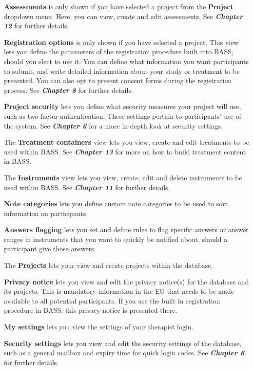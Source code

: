 \documentclass[
]{book}
\begin{document}
\textbf{Assessments} is only shown if you have selected a project from the \textbf{Project} dropdown menu. Here, you can view, create and edit assessments. See \textbf{\emph{Chapter 12}} for further details.

\textbf{Registration options} is only shown if you have selected a project. This view lets you define the parameters of the registration procedure built into BASS, should you elect to use it. You can define what information you want participants to submit, and write detailed information about your study or treatment to be presented. You can also opt to present consent forms during the registration process. See \textbf{\emph{Chapter 8}} for further details.

\textbf{Project security} lets you define what security measures your project will use, such as two-factor authentication. These settings pertain to participants' use of the system. See \textbf{\emph{Chapter 6}} for a more in-depth look at security settings.

The \textbf{Treatment containers} view lets you view, create and edit treatments to be used within BASS. See \textbf{\emph{Chapter 13}} for more on how to build treatment content in BASS.

The \textbf{Instruments} view lets you view, create, edit and delete instruments to be used within BASS. See \textbf{\emph{Chapter 11}} for further details.

\textbf{Note categories} lets you define custom note categories to be used to sort information on participants.

\textbf{Answers flagging} lets you set and define rules to flag specific answers or answer ranges in instruments that you want to quickly be notified about, should a participant give those answers.

The \textbf{Projects} lets your view and create projects within the database.

\textbf{Privacy notice} lets you view and edit the privacy notice(s) for the database and its projects. This is mandatory information in the EU that needs to be made available to all potential participants. If you use the built in registration procedure in BASS, this privacy notice is presented there.

\textbf{My settings} lets you view the settings of your therapist login.

\textbf{Security settings} lets you view and edit the security settings of the database, such as a general mailbox and expiry time for quick login codes. See \textbf{\emph{Chapter 6}} for further details.
\end{document}
